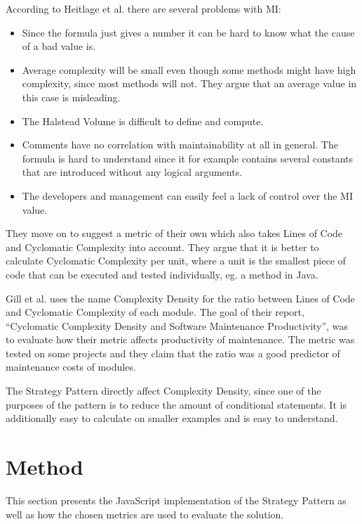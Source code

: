 \documentclass[conference, a4paper]{IEEEtran}
\begin{document}
According to Heitlage et al. there are several problems with MI:
	\begin{itemize}
		\item Since the formula just gives a number it can be hard to know what the cause of a bad value is.
		\item Average complexity will be small even though some methods might have high complexity, since most methods will not. They argue that an average value in this case is misleading.
		\item The Halstead Volume is difficult to define and compute.
		\item Comments have no correlation with maintainability at all in general. The formula is hard to understand since it for example contains several constants that are introduced without any logical arguments.
		\item The developers and management can easily feel a lack of control over the MI value.
	\end{itemize}
They move on to suggest a metric of their own which also takes Lines of Code and Cyclomatic Complexity into account. They argue that it is better to calculate Cyclomatic Complexity per unit, where a unit is the smallest piece of code that can be executed and tested individually, eg. a method in Java.~\cite{bibitem:Maintainability}

Gill et al. uses the name Complexity Density for the ratio between Lines of Code and Cyclomatic Complexity of each module. The goal of their report, ``Cyclomatic Complexity Density and Software Maintenance Productivity'', was to evaluate how their metric affects productivity of maintenance. The metric was tested on some projects and they claim that the ratio was a good predictor of maintenance costs of modules.~\cite{bibitem:CCD}

The Strategy Pattern directly affect Complexity Density, since one of the purposes of the pattern is to reduce the amount of conditional statements. It is additionally easy to calculate on smaller examples and is easy to understand.

\section{Method}
This section presents the JavaScript implementation of the Strategy Pattern as well as how the chosen metrics are used to evaluate the solution.
\end{document}
